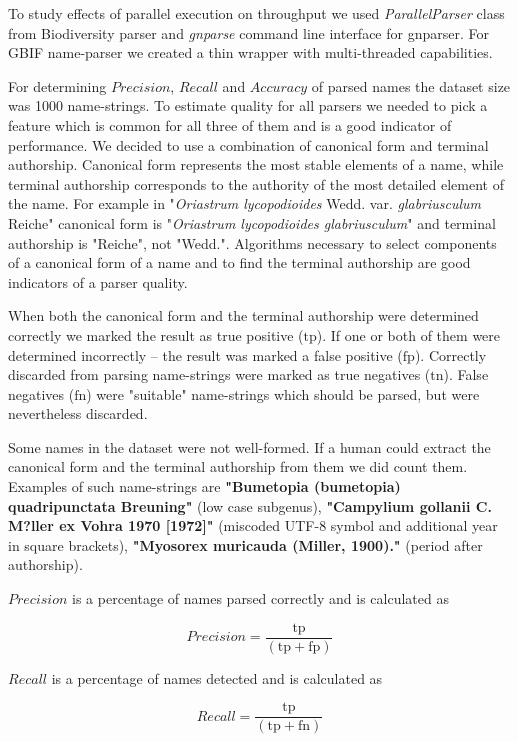 \documentclass{bmcart}
\begin{document}
To study effects of parallel execution on throughput we used
\textit{ParallelParser} class from Biodiversity parser and \textit{gnparse}
command line interface for gnparser. For GBIF name-parser we created a thin
wrapper with multi-threaded capabilities\cite{gbifparser}.

For determining $Precision$, $Recall$ and $Accuracy$ of parsed names the
dataset size was 1000 name-strings. To estimate quality for all parsers we
needed to pick a feature which is common for all three of them and is a good
indicator of performance.  We decided to use a combination of canonical form
and terminal authorship.  Canonical form represents the most stable elements
of a name, while terminal authorship corresponds to the authority of the most
detailed element of the name. For example in "\textit{Oriastrum lycopodioides}
Wedd.  var.  \textit{glabriusculum} Reiche" canonical form is
"\textit{Oriastrum lycopodioides glabriusculum}" and terminal authorship is
"Reiche", not "Wedd.".  Algorithms necessary to select components of a
canonical form of a name and to find the terminal authorship are good
indicators of a parser quality.

When both the canonical form and the terminal authorship were determined
correctly we marked the result as true positive ($\text{tp}$).  If one or both
of them were determined incorrectly -- the result was marked a false positive
($\text{fp}$). Correctly discarded from parsing name-strings were marked as
true negatives ($\text{tn}$). False negatives ($\text{fn}$) were "suitable"
name-strings which should be parsed, but were nevertheless discarded.

Some names in the dataset were not well-formed. If a human could extract the
canonical form and the terminal authorship from them we did count them.
Examples of such name-strings are \textbf{"Bumetopia (bumetopia)
quadripunctata Breuning"} (low case subgenus), \textbf{"Campylium gollanii C.
M?ller ex Vohra 1970 [1972]"} (miscoded UTF-8 symbol and additional year in
square brackets), \textbf{"Myosorex muricauda (Miller, 1900)."} (period after
authorship).

$Precision$ is a percentage of names parsed correctly and is calculated as

\[Precision = \dfrac{\text{tp}}{(\text{tp} + \text{fp})}\]

$Recall$ is a percentage of names detected and is calculated as

\[Recall = \dfrac{\text{tp}}{(\text{tp} + \text{fn})}\]
\end{document}
